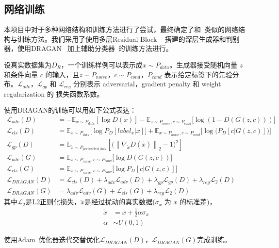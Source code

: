\documentclass[a4paper,12pt,UTF8]{ctexart}
\newcommand{\norm}[1]{\left\lVert#1\right\rVert}
\begin{document}
\subsection{网络训练}

本项目中对于多种网络结构和训练方法进行了尝试，最终确定了和~\cite{Jin2017Towards}类似的网络结构与训练方法。我们采用了使用多层Residual Block ~\cite{he2016deep} 搭建的深层生成器和判别器，使用DRAGAN ~\cite{kodali2017convergence}加上辅助分类器~\cite{odena2016conditional}的训练方法进行。

设真实数据集为$D_R$，一个训练样例可以表示成$x \sim P_{data}$。生成器接受随机向量 $z$ 和条件向量 $c$ 的输入，且$z \sim P_{noise}$，$c \sim P_{cond}$，$P_{cond}$ 表示给定标签下的先验分布。$\mathcal{L}_{adv}$，$\mathcal{L}_{gp}$ 和 $\mathcal{L}_{reg}$ 分别表示 adversarial，gradient penalty 和 weight regularization 的 损失函数系数。

使用DRAGAN的训练可以用如下公式表达：
%
\begin{align}
  \mathcal{L}_{adv}(D) &= -\mathbb{E}_{x\sim P_{data}}[\log D(x)] - \mathbb{E}_{z\sim P_{noise},c\sim P_{cond}}\big[\log(1-D(G(z,c)))\big] \\
  \mathcal{L}_{cls}(D) &= \mathbb{E}_{x\sim P_{data}}\big[\log P_D[label_x|x]\big] + \mathbb{E}_{x\sim P_{noise},c\sim P_{cond}}\Big[\log\big(P_D[c|G(z,c)]\big)\Big] \\
  \mathcal{L}_{gp}(D) &= \mathbb{E}_{\tilde{x}\sim P_{perturebed\_data}}\left[\big(\norm{\nabla_{\tilde{x}}D(\tilde{x})}_2-1\big)^2\right] \\
  \mathcal{L}_{adv}(G) &= \mathbb{E}_{x\sim P_{noise},c\sim P_{cond}}\big[\log D(G(z,c))\big] \\
  \mathcal{L}_{cls}(G) &= \mathbb{E}_{x\sim P_{noise},c\sim P_{cond}}\big[\log P_D[c|G(z,c)]\big] \\
  \mathcal{L}_{DRAGAN}(D) &= \mathcal{L}_{cls}(D) + \lambda_{adv}\mathcal{L}_{adv}(D) + \lambda_{gp}\mathcal{L}_{gp}(D) + \lambda_{reg} \mathcal{L}_{2}(D) \\
  \mathcal{L}_{DRAGAN}(G) &= \lambda_{adv}\mathcal{L}_{adv}(G) + \mathcal{L}_{cls}(G) + \lambda_{reg} \mathcal{L}_{2}(D)
\end{align}
%
其中$\mathcal{L}_{2}$是L2正则化损失，$\tilde{x}$是经过扰动的真实数据($\sigma_x$ 为 $x$ 的标准差)，
%
\begin{align}
  \tilde{x} & = x + \frac{1}{2}\alpha\sigma_x \\
  \alpha & \sim U(0, 1)
\end{align}

使用Adam~\cite{Kingma2014Adam}优化器迭代交替优化$\mathcal{L}_{DRAGAN}(D)$，$\mathcal{L}_{DRAGAN}(G)$完成训练。
\end{document}
